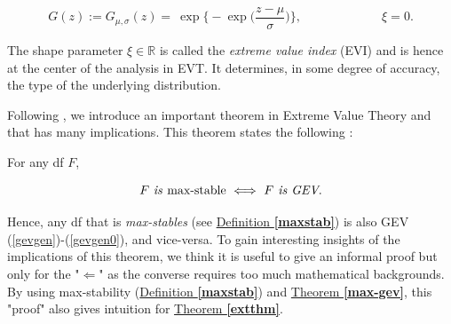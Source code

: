 \begin{equation}\label{gevgen0}
G(z):=G_{\mu,\sigma}(z)=\ \exp \Bigg\{-\exp\bigg(\frac{z-\mu}{\sigma}\bigg)\Bigg\}, \qquad\qquad\qquad \ \ \xi=0.
\end{equation}

The shape parameter $\xi\in\mathbb{R}$ is called the \emph{extreme value index} (EVI) and is hence at the center of the analysis in EVT. It determines, in some degree of accuracy, the type of the underlying distribution. %

Following \cite{coles_introduction_2001}, we introduce an important theorem in Extreme Value Theory and that has many implications. This theorem states the following :

\begin{theorem}\label{max-gev} For any df $F$,
	
	\begin{equation}
	F \ \emph{\text{is \emph{max-stable}}}\ \Longleftrightarrow \ F \emph{\text{ is GEV}}.
	\end{equation}
\end{theorem}
Hence, any df that is \emph{max-stables} (see \hyperref[maxstab]{ Definition \textbf{\ref{maxstab}}}) is also GEV (\ref{gevgen})-(\ref{gevgen0}), and vice-versa. To gain interesting insights of the implications of this theorem, we think it is useful to give an informal proof but only for the "$\Leftarrow$" as the converse requires too much mathematical backgrounds. By using max-stability (\hyperref[maxstab]{Definition \textbf{\ref{maxstab}}}) and \hyperref[max-gev]{Theorem \textbf{\ref{max-gev}}}, this "proof" also gives intuition for \hyperref[extthm]{Theorem \textbf{\ref{extthm}}}. 

